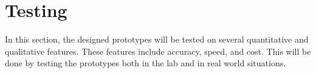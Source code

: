 \newpage
\section{Testing}
In this section, the designed prototypes will be tested on several quantitative and qualitative features. These features include accuracy, speed, and cost. This will be done by testing the prototypes both in the lab and in real world situations.


